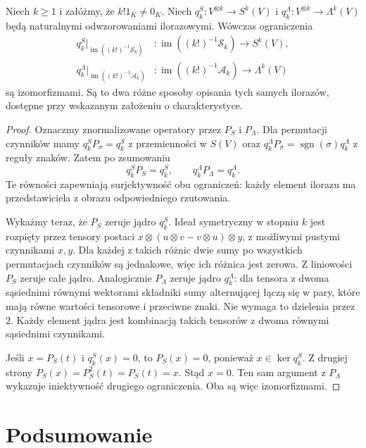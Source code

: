\begin{stwierdzenie}
\label{prop:lin10-projekcje-ilorazy}
Niech \(k\ge1\) i załóżmy,
że \(k!1_K\ne0_K\).
Niech \(q_k^S\colon
V^{\otimes k}\to S^k(V)\)
i \(q_k^\Lambda\colon
V^{\otimes k}\to\Lambda^k(V)\)
będą naturalnymi odwzorowaniami
ilorazowymi.
Wówczas ograniczenia
\[
 \begin{aligned}
 q_k^S|_{\operatorname{im}((k!)^{-1}\mathcal S_k)}
 &\colon \operatorname{im}((k!)^{-1}\mathcal S_k)
       \longrightarrow S^k(V),\\
 q_k^\Lambda|_{\operatorname{im}((k!)^{-1}\mathcal A_k)}
 &\colon \operatorname{im}((k!)^{-1}\mathcal A_k)
       \longrightarrow \Lambda^k(V)
 \end{aligned}
\]
są izomorfizmami.
Są to dwa różne sposoby
opisania tych samych ilorazów,
dostępne przy wskazanym
założeniu o charakterystyce.
\end{stwierdzenie}
\begin{proof}
Oznaczmy znormalizowane operatory
przez \(P_S\) i \(P_\Lambda\).
Dla permutacji czynników
mamy
\(q_k^S P_\sigma=q_k^S\)
z przemienności w \(S(V)\)
oraz
\(q_k^\Lambda P_\sigma
=\operatorname{sgn}(\sigma)q_k^\Lambda\)
z reguły znaków.
Zatem po zsumowaniu
\[
 q_k^S P_S=q_k^S,\qquad
 q_k^\Lambda P_\Lambda=q_k^\Lambda.
\]
Te równości zapewniają
surjektywność obu ograniczeń:
każdy element ilorazu
ma przedstawiciela z obrazu
odpowiedniego rzutowania.

Wykażmy teraz, że
\(P_S\) zeruje jądro \(q_k^S\).
Ideał symetryczny w stopniu
\(k\) jest rozpięty przez
tensory postaci
\(x\otimes(u\otimes v-v\otimes u)\otimes y\),
z możliwymi pustymi czynnikami
\(x,y\). Dla każdej z takich
różnic dwie sumy po
wszystkich permutacjach
czynników są jednakowe,
więc ich różnica jest zerowa.
Z liniowości \(P_S\)
zeruje całe jądro.
Analogicznie
\(P_\Lambda\) zeruje jądro
\(q_k^\Lambda\):
dla tensora z dwoma
sąsiednimi równymi wektorami
składniki sumy alternującej
łączą się w pary,
które mają równe wartości
tensorowe i przeciwne znaki.
Nie wymaga to dzielenia
przez \(2\).
Każdy element jądra
jest kombinacją takich
tensorów z dwoma
równymi sąsiednimi czynnikami.

Jeśli \(x=P_S(t)\)
i \(q_k^S(x)=0\), to
\(P_S(x)=0\), ponieważ
\(x\in\ker q_k^S\).
Z drugiej strony
\(P_S(x)=P_S^2(t)=P_S(t)=x\).
Stąd \(x=0\).
Ten sam argument
z \(P_\Lambda\) wykazuje
iniektywność drugiego
ograniczenia. Oba są więc
izomorfizmami.
\end{proof}

\section{Podsumowanie}
\label{sec:lin10-podsumowanie}

